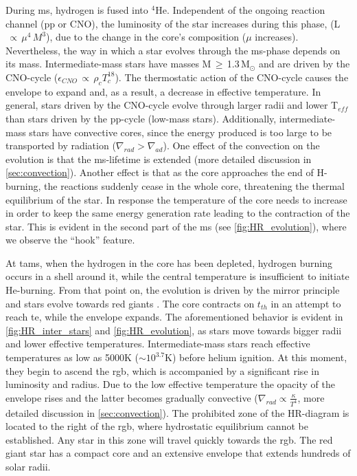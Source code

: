 During \ac{ms}, hydrogen is fused into $^4$He. Independent of the ongoing reaction channel (pp or CNO), the luminosity of the star increases during this phase, (L$\,\propto\,\mu^{4}\,M^3$), due to the change in the core's composition ($\mu$ increases). Nevertheless, the way in which a star evolves through the \ac{ms}-phase depends on its mass. Intermediate-mass stars have masses M\,$\geq$\,1.3\,M$_\odot$ and are driven by the CNO-cycle ($\epsilon_{CNO}\,\propto\,\rho_{c}T^{18}_{c}$). The thermostatic action of the CNO-cycle causes the envelope to expand and, as a result, a decrease in effective temperature. In general, stars driven by the CNO-cycle evolve through larger radii and lower T$_{eff}$ than stars driven by the pp-cycle (low-mass stars). Additionally, intermediate-mass stars have convective cores, since the energy produced is too large to be transported by radiation ($\nabla_{rad} > \nabla_{ad}$). One effect of the convection on the evolution is that the \ac{ms}-lifetime is extended (more detailed discussion in \cref{sec:convection}). Another effect is that as the core approaches the end of H-burning, the reactions suddenly cease in the whole core, threatening the thermal equilibrium of the star. In response the temperature of the core needs to increase in order to keep the same energy generation rate leading to the contraction of the star. This is evident in the second part of the \ac{ms} (see \cref{fig:HR_evolution}), where we observe the ``hook'' feature. 

At \ac{tams}, when the hydrogen in the core has been depleted, hydrogen burning occurs in a shell around it, while the central temperature is insufficient to initiate He-burning. From that point on, the evolution is driven by the mirror principle and stars evolve towards red giants \citep{pols2011stellar}. The core contracts on $t_{th}$ in an attempt to reach \ac{te}, while the envelope expands. The aforementioned behavior is evident in \cref{fig:HR_inter_stars} and \cref{fig:HR_evolution}, as stars move towards bigger radii and lower effective temperatures. Intermediate-mass stars reach effective temperatures as low as 5000K ($\sim 10^{3.7}$K) before helium ignition. At this moment, they begin to ascend the \ac{rgb}, which is accompanied by a significant rise in luminosity and radius. Due to the low effective temperature the opacity of the envelope rises and the latter becomes gradually convective ($\nabla_{rad} \propto \frac{\kappa}{T^4}$, more detailed discussion in \cref{sec:convection}). The prohibited zone of the HR-diagram is located to the right of the \ac{rgb}, where hydrostatic equilibrium cannot be established. Any star in this zone will travel quickly towards the \ac{rgb}. The red giant star has a compact core and an extensive envelope that extends hundreds of solar radii. 

